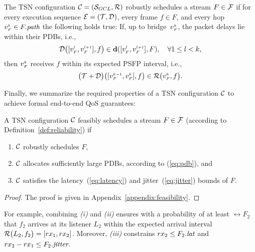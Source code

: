 \begin{definition}[Robustness] \label{def:robustness}
  The TSN configuration $\Conf = (\GCL, \R{})$ robustly schedules a stream $F \in \TT$ if for every execution sequence $\E = (\T{}, \D{})$, every frame $f \in F$, and every hop $\v{k}{F} \in \path{F}$ the following holds true:
  If, up to bridge~$\v{k}{F}$, the packet delays lie within their PDBs, i.e.,
  \begin{equation*} \label{eq:robustness:precondition}
    \D{[\v{l}{F}, \v{l+1}{F}], f} \in \dpdb{[\v{l}{F}, \v{l+1}{F}], F}, \quad \forall 1 \leq l < k,
  \end{equation*}
  then $\v{k}{F}$ receives $f$ within its expected PSFP interval, i.e.,
  \begin{equation*} \label{eq:robustness:postcondition}
    \add{\T}{\D}{[\v{k-1}{F}, \v{k}{F}], f} \in \R{\v{k}{F}, f}.
  \end{equation*}
\end{definition}

Finally, we summarize the required properties of a TSN configuration $\Conf$ to achieve formal end-to-end QoS guarantees:
\begin{theorem}[Feasibility] \label{theorem:feasibility}
  A TSN configuration $\Conf$ feasibly schedules a stream $F \in \TT$ (according to Definition~\ref{def:reliability}) if
  \begin{enumerate}[label=(\roman*)]
    \item $\Conf$ robustly schedules $F$,
    \item $\Conf$ allocates sufficiently large PDBs, according to (\ref{eq:pdb}), and
    \item $\Conf$ satisfies the latency~(\ref{eq:latency}) and jitter~(\ref{eq:jitter}) bounds of $F$.
  \end{enumerate}
\end{theorem}
\begin{proof}
  The proof is given in Appendix~\ref{appendix:feasibility}.
\end{proof}

\noindent For example, combining \textit{(i)} and \textit{(ii)} ensures \ldash with a probability of at least $\rel{F_2}$ \rdash that $f_2$ arrives at its listener $L_2$ within the expected arrival interval $\R{L_2, f_2} = [rx_1, rx_2]$.
Moreover, \textit{(iii)} constrains $rx_2 \leq \ete{F_2}$ and $rx_2 - rx_1 \leq \jitter{F_2}$.
